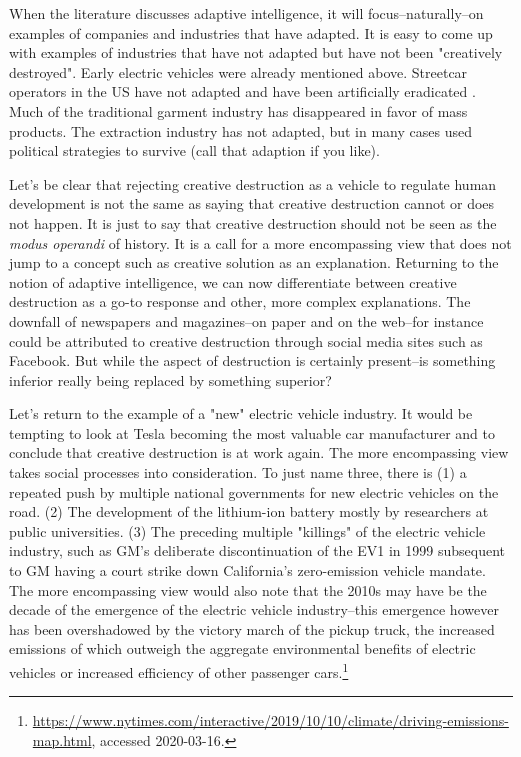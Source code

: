 \documentclass{article}
\begin{document}
	When the literature discusses adaptive intelligence, it will focus--naturally--on examples of companies and industries that have adapted. It is easy to come up with examples of industries that have not adapted but have not been "creatively destroyed". Early electric vehicles were already mentioned above. Streetcar operators in the US have not adapted and have been artificially eradicated \citep{Norton2011}. Much of the traditional garment industry has disappeared in favor of mass products. The extraction industry has not adapted, but in many cases used political strategies to survive (call that adaption if you like).

	Let's be clear that rejecting creative destruction as a vehicle to regulate human development is not the same as saying that creative destruction cannot or does not happen. It is just to say that creative destruction should not be seen as the \textit{modus operandi} of history. It is a call for a more encompassing view that does not jump to a concept such as creative solution as an explanation. Returning to the notion of adaptive intelligence, we can now differentiate between creative destruction as a go-to response and other, more complex explanations. The downfall of newspapers and magazines--on paper and on the web--for instance could be attributed to creative destruction through social media sites such as Facebook. But while the aspect of destruction is certainly present--is something inferior really being replaced by something superior?

	Let's return to the example of a "new" electric vehicle industry. It would be tempting to look at Tesla becoming the most valuable car manufacturer and to conclude that creative destruction is at work again. The more encompassing view takes social processes into consideration. To just name three, there is (1) a repeated push by multiple national governments for new electric vehicles on the road. (2) The development of the lithium-ion battery mostly by researchers at public universities. (3) The preceding multiple "killings" of the electric vehicle industry, such as GM's deliberate discontinuation of the EV1 in 1999 subsequent to GM having a court strike down California's zero-emission vehicle mandate. The more encompassing view would also note that the 2010s may have be the decade of the emergence of the electric vehicle industry--this emergence however has been overshadowed by the victory march of the pickup truck, the increased emissions of which outweigh the aggregate environmental benefits of electric vehicles or increased efficiency of other passenger cars.\footnote{\url{https://www.nytimes.com/interactive/2019/10/10/climate/driving-emissions-map.html}, accessed 2020-03-16.}
\end{document}
